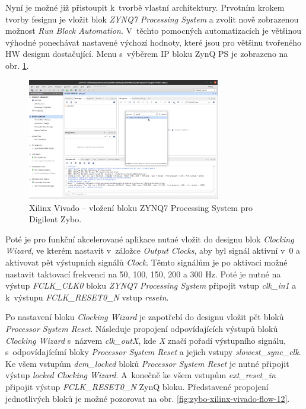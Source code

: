 \documentclass[a4paper, twoside, 11pt]{article}
\begin{document}
\begin{appendices}
		Nyní je možné již přistoupit k~tvorbě vlastní architektury. Prvotním krokem tvorby fesignu je vložit blok \textit{ZYNQ7 Processing System} a zvolit nově zobrazenou možnost \textit{Run Block Automation}. V~těchto pomocných automatizacích je většinou výhodné ponechávat nastavené výchozí hodnoty, které jsou pro většinu tvořeného HW designu dostačující. Menu s~výběrem IP bloku ZynQ PS je zobrazeno na obr. \ref{fig:zybo-xilinx-vivado-flow-07}.

		\begin{figure}[htbp!]
			\centering
			\includegraphics[width=0.75\textwidth]{src/png/zybo-xilinx-vivado-flow/zybo-xilinx-vivado-flow-07.jpg}
			\caption{Xilinx Vivado – vložení bloku ZYNQ7 Processing System pro Digilent Zybo.}
			\label{fig:zybo-xilinx-vivado-flow-07}
		\end{figure}


		Poté je pro funkční akcelerované aplikace nutné vložit do designu blok \textit{Clocking Wizard}, ve kterém nastavit v~záložce \textit{Output Clocks}, aby byl signál aktivní v~0 a aktivovat pět výstupních signálů \textit{Clock}. Těmto signálům je po aktivaci možné nastavit taktovací frekvenci na 50, 100, 150, 200 a 300 Hz. Poté je nutné na výstup \textit{FCLK\_CLK0} bloku \textit{ZYNQ7 Processing System} připojit vstup \textit{clk\_in1} a k~výstupu \textit{FCLK\_RESET0\_N} vstup \textit{resetn}.\par
		Po nastavení bloku \textit{Clocking Wizard} je zapotřebí do designu vložit pět bloků \textit{Processor System Reset}. Následuje propojení odpovídajících výstupů bloků \textit{Clocking Wizard} s~názvem \textit{clk\_outX}, kde \textit{X} značí pořadí výstupního signálu, s~odpovídajícímí bloky \textit{Processor System Reset} a jejich vstupy \textit{slowest\_sync\_clk}. Ke všem vstupům \textit{dcm\_locked} bloků \textit{Processor System Reset} je nutné připojit výstup \textit{locked} \textit{Clocking Wizard}. A~konečně ke všem vstupům \textit{ext\_reset\_in} připojit výstup \textit{FCLK\_RESET0\_N} ZynQ bloku. Představené propojení jednotlivých bloků je možné pozorovat na obr. \ref{fig:zybo-xilinx-vivado-flow-12}.


\end{appendices}
\end{document}

